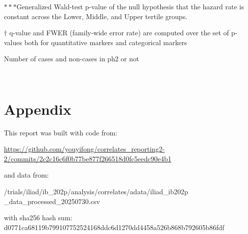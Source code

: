 \documentclass[]{book}
\begin{document}
\(\ast\ast\)\(\ast\)Generalized Wald-test p-value of the null hypothesis that the hazard rate is constant across the Lower, Middle, and Upper tertile groups.

\(\dagger\) q-value and FWER (family-wide error rate) are computed over the set of p-values both for quantitative markers and categorical markers

\clearpage
\begin{table}[H]
\caption{Number of cases and non-cases in ph2 or not}
\begin{center}
  \\
\end{center}
\end{table}

\clearpage

\hypertarget{appendix}{%
\chapter{Appendix}\label{appendix}}

This report was built with code from:

\url{https://github.com/youyifong/correlates_reporting2-2/commits/2c2c16c6f0b77be877f266518d0fc5eedc90e4b1}

and data from:

/trials/iliad/ib\_202p/analysis/correlates/adata/iliad\_ib202p \_data\_processed\_20250730.csv

with sha256 hash sum: d0771ca68119b799107752524168ddc6d1270dd4458a526b868b792605b86fdf
\end{document}
